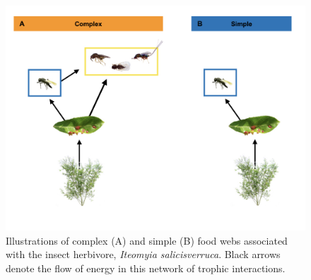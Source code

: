\begin{figure}
\centering
\includegraphics{analyses/complex_simple_foodwebs.jpeg}
\caption{\label{fig:Conceptual}Illustrations of complex (A) and simple
(B) food webs associated with the insect herbivore, \emph{Iteomyia
salicisverruca}. Black arrows denote the flow of energy in this network
of trophic interactions.}
\end{figure}
